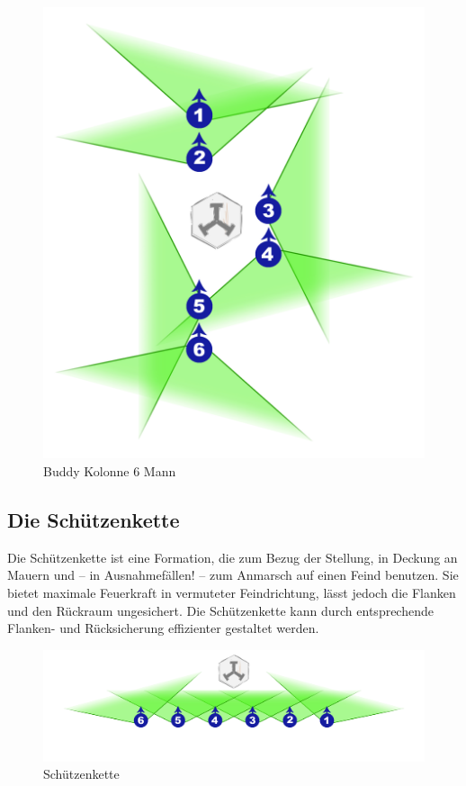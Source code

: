 \begin{figure}[htbp]
	\centering
	\includegraphics[width=13cm]{./img/grundlagen/formationen/kolonne_6mann.jpg}
	\caption{Buddy Kolonne 6 Mann}
\end{figure}

\subsection{Die Schützenkette}
Die Schützenkette ist eine Formation, die zum Bezug der Stellung, in Deckung an Mauern und -- in Ausnahmefällen! -- zum Anmarsch auf einen Feind benutzen. Sie bietet maximale Feuerkraft in vermuteter Feindrichtung, lässt jedoch die Flanken und den Rückraum ungesichert. Die Schützenkette kann  durch entsprechende Flanken- und Rücksicherung effizienter gestaltet werden.\\
\begin{figure}[htbp]
	\centering
	\includegraphics[width=13cm]{./img/grundlagen/formationen/kette_6mann.jpg}
		\caption{Schützenkette}
\end{figure}